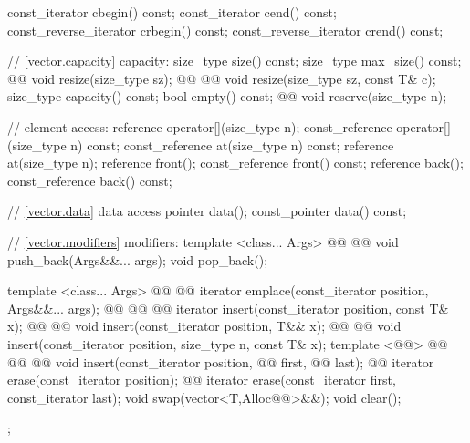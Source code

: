 \documentclass[american,twoside]{book}
\begin{document}
\begin{codeblock}
{{    const_iterator         cbegin() const;
    const_iterator         cend() const;
    const_reverse_iterator crbegin() const;
    const_reverse_iterator crend() const;

    // \ref{vector.capacity} capacity:
    size_type size() const;
    size_type max_size() const;
    @@
      void resize(size_type sz);
    @@ @@
      void resize(size_type sz, const T& c);
    size_type capacity() const;
    bool      empty() const;
    @@ void reserve(size_type n);

    // element access:
    reference       operator[](size_type n);
    const_reference operator[](size_type n) const;
    const_reference at(size_type n) const;
    reference       at(size_type n);
    reference       front();
    const_reference front() const;
    reference       back();
    const_reference back() const;

    // \ref{vector.data} data access
    pointer         data();
    const_pointer   data() const;

    // \ref{vector.modifiers} modifiers:
    template <class... Args> 
      @@
            @@
      void push_back(Args&&... args);
    void pop_back();

    template <class... Args> 
      @@
            @@
      iterator emplace(const_iterator position, Args&&... args);
    @@ @@ @@ 
      iterator insert(const_iterator position, const T& x);
    @@ @@
      void insert(const_iterator position, T&& x);
    @@ @@ 
      void insert(const_iterator position, size_type n, const T& x);
    template <@@>
        @@
              @@ @@
        void insert(const_iterator position,
                    @@ first, @@ last);
    @@ iterator erase(const_iterator position);
    @@ iterator erase(const_iterator first, const_iterator last);
    void     swap(vector<T,Alloc@@>&&);
    void     clear();
  };

}
\end{codeblock}
\end{document}
